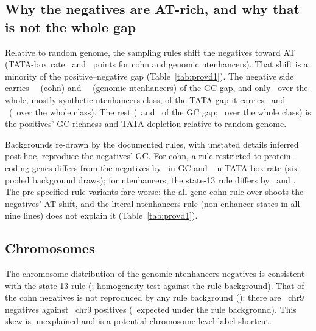 \documentclass[journal,onecolumn,10pt,letterpaper]{IEEEtran}
\newcommand{\tasku}{\textunderscore\allowbreak}
\DeclareRobustCommand{\task}[1]{{\normalfont\ttfamily\upshape\let\_\tasku #1}}
\begin{document}


\subsection{Why the negatives are AT-rich, and why that is not the whole gap}
Relative to random genome, the sampling rules shift the negatives toward AT (TATA-box rate
\smTataShiftCohn\ and \smTataShiftNt\ points for \task{cohn} and genomic \task{nt\_enhancers}). That
shift is a minority of the positive--negative gap (Table~\ref{tab:provd1}). The negative side carries
\smShareCohnGC\ \smShareCohnGCCI\ (\task{cohn}) and \smShareNtGC\ \smShareNtGCCI\ (genomic
\task{nt\_enhancers}) of the GC gap, and only \smShareWholeGC\ over the whole, mostly synthetic
\task{nt\_enhancers} class; of the TATA gap it carries \smShareCohnTata\ and \smShareNtTata\
(\smShareWholeTata\ over the whole class). The rest (\smPosShareCohnGC\ and \smPosShareNtGC\ of the GC
gap; \smPosShareWholeGC\ over the whole class) is the positives' GC-richness and TATA depletion
relative to random genome.

Backgrounds re-drawn by the documented rules, with unstated details inferred post hoc, reproduce the
negatives' GC. For \task{cohn}, a rule restricted to protein-coding genes differs from the negatives
by \smBgPcGC\ in GC and \smBgPcTata\ in TATA-box rate (six pooled background draws); for
\task{nt\_enhancers}, the state-13 rule differs by \smBgSthirteenGC\ and \smBgSthirteenTata. The
pre-specified rule variants fare worse: the all-gene \task{cohn} rule over-shoots the negatives' AT
shift, and the literal \task{nt\_enhancers} rule (non-enhancer states in all nine lines) does not
explain it (Table~\ref{tab:provd1}).



\subsection{Chromosomes}
The chromosome distribution of the genomic \task{nt\_enhancers} negatives is consistent with the
state-13 rule (\smChromNtChi; homogeneity test against the rule background). That of the \task{cohn}
negatives is not reproduced by any rule background (\smChromCohnP): there are \smChrNineNeg\ chr9
negatives against \smChrNinePos\ chr9 positives (\smChrNineExp\ expected under the rule background).
This skew is unexplained and is a potential chromosome-level label shortcut.



\end{document}

